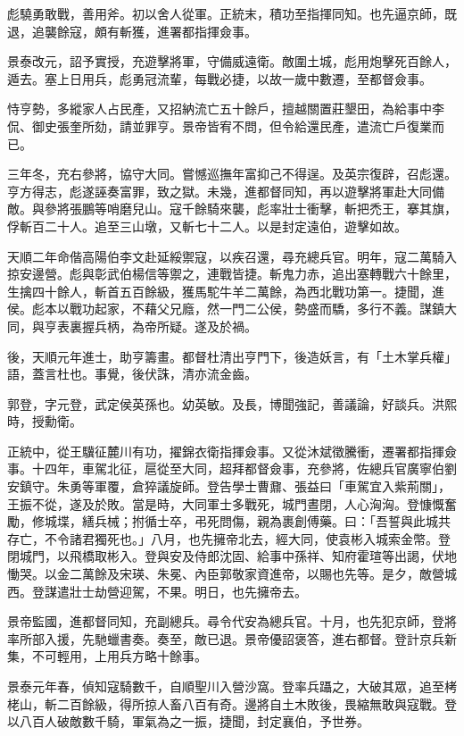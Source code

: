 \begin{pinyinscope}
彪驍勇敢戰，善用斧。初以舍人從軍。正統末，積功至指揮同知。也先逼京師，既退，追襲餘寇，頗有斬獲，進署都指揮僉事。

景泰改元，詔予實授，充遊擊將軍，守備威遠衛。敵圍土城，彪用炮擊死百餘人，遁去。塞上日用兵，彪勇冠流輩，每戰必捷，以故一歲中數遷，至都督僉事。

恃亨勢，多縱家人占民產，又招納流亡五十餘戶，擅越關置莊墾田，為給事中李侃、御史張奎所劾，請並罪亨。景帝皆宥不問，但令給還民產，遣流亡戶復業而已。

三年冬，充右參將，協守大同。嘗憾巡撫年富抑己不得逞。及英宗復辟，召彪還。亨方得志，彪遂誣奏富罪，致之獄。未幾，進都督同知，再以遊擊將軍赴大同備敵。與參將張鵬等哨磨兒山。寇千餘騎來襲，彪率壯士衝擊，斬把禿王，搴其旗，俘斬百二十人。追至三山墩，又斬七十二人。以是封定遠伯，遊擊如故。

天順二年命偕高陽伯李文赴延綏禦寇，以疾召還，尋充總兵官。明年，寇二萬騎入掠安邊營。彪與彰武伯楊信等禦之，連戰皆捷。斬鬼力赤，追出塞轉戰六十餘里，生擒四十餘人，斬首五百餘級，獲馬駝牛羊二萬餘，為西北戰功第一。捷聞，進侯。彪本以戰功起家，不藉父兄廕，然一門二公侯，勢盛而驕，多行不義。謀鎮大同，與亨表裏握兵柄，為帝所疑。遂及於禍。

後，天順元年進士，助亨籌畫。都督杜清出亨門下，後造妖言，有「土木掌兵權」語，蓋言杜也。事覺，後伏誅，清亦流金齒。

郭登，字元登，武定侯英孫也。幼英敏。及長，博聞強記，善議論，好談兵。洪熙時，授勳衛。

正統中，從王驥征麓川有功，擢錦衣衛指揮僉事。又從沐斌徵騰衝，遷署都指揮僉事。十四年，車駕北征，扈從至大同，超拜都督僉事，充參將，佐總兵官廣寧伯劉安鎮守。朱勇等軍覆，倉猝議旋師。登告學士曹鼐、張益曰「車駕宜入紫荊關」，王振不從，遂及於敗。當是時，大同軍士多戰死，城門晝閉，人心洶洶。登慷慨奮勵，修城堞，繕兵械；拊循士卒，弔死問傷，親為裹創傅藥。曰：「吾誓與此城共存亡，不令諸君獨死也。」八月，也先擁帝北去，經大同，使袁彬入城索金幣。登閉城門，以飛橋取彬入。登與安及侍郎沈固、給事中孫祥、知府霍瑄等出謁，伏地慟哭。以金二萬餘及宋瑛、朱冕、內臣郭敬家資進帝，以賜也先等。是夕，敵營城西。登謀遣壯士劫營迎駕，不果。明日，也先擁帝去。

景帝監國，進都督同知，充副總兵。尋令代安為總兵官。十月，也先犯京師，登將率所部入援，先馳蠟書奏。奏至，敵已退。景帝優詔褒答，進右都督。登計京兵新集，不可輕用，上用兵方略十餘事。

景泰元年春，偵知寇騎數千，自順聖川入營沙窩。登率兵躡之，大破其眾，追至栲栳山，斬二百餘級，得所掠人畜八百有奇。邊將自土木敗後，畏縮無敢與寇戰。登以八百人破敵數千騎，軍氣為之一振，捷聞，封定襄伯，予世券。


\end{pinyinscope}
